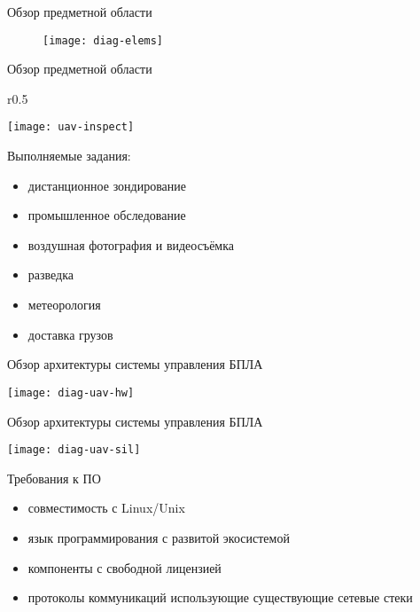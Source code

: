 \documentclass[aspectratio=169]{beamer}
\begin{document}
\begin{frame}{Обзор предметной области}
  \begin{figure}[!h]
    \begin{center}
      \texttt{[image: diag-elems]}
    \end{center}
  \end{figure}
\end{frame}


\begin{frame}{Обзор предметной области}
  \begin{wrapfigure}{r}{0.5\textwidth}
    \begin{center}
      \texttt{[image: uav-inspect]}
    \end{center}
  \end{wrapfigure}
  Выполняемые задания:

  \begin{itemize}
    \item дистанционное зондирование
    \item промышленное обследование
    \item воздушная фотография и видеосъёмка
    \item разведка
    \item метеорология
    \item доставка грузов
  \end{itemize}
\end{frame}


\begin{frame}{Обзор архитектуры системы управления БПЛА}
  \begin{center}
    \texttt{[image: diag-uav-hw]}
  \end{center}
\end{frame}


\begin{frame}{Обзор архитектуры системы управления БПЛА}
  \begin{center}
    \texttt{[image: diag-uav-sil]}
  \end{center}
\end{frame}


\begin{frame}{Требования к ПО}
  \begin{itemize}
    \item совместимость с Linux/Unix
    \item язык программирования с развитой экосистемой
    \item компоненты с свободной лицензией
    \item протоколы коммуникаций использующие существующие сетевые стеки
  \end{itemize}
\end{frame}
\end{document}
